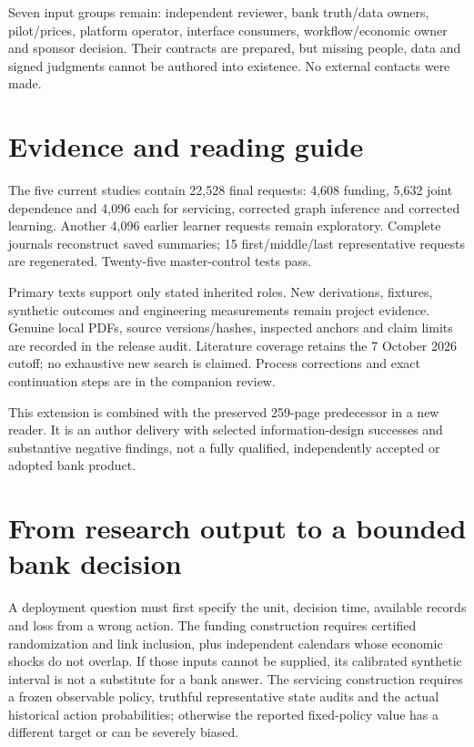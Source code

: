 Seven input groups remain: independent reviewer, bank truth/data owners, pilot/prices, platform operator, interface consumers, workflow/economic owner and sponsor decision. Their contracts are prepared, but missing people, data and signed judgments cannot be authored into existence. No external contacts were made.

\section*{Evidence and reading guide}
The five current studies contain 22,528 final requests: 4,608 funding, 5,632 joint dependence and 4,096 each for servicing, corrected graph inference and corrected learning. Another 4,096 earlier learner requests remain exploratory. Complete journals reconstruct saved summaries; 15 first/middle/last representative requests are regenerated. Twenty-five master-control tests pass.

Primary texts support only stated inherited roles. New derivations, fixtures, synthetic outcomes and engineering measurements remain project evidence. Genuine local PDFs, source versions/hashes, inspected anchors and claim limits are recorded in the release audit. Literature coverage retains the 7 October 2026 cutoff; no exhaustive new search is claimed. Process corrections and exact continuation steps are in the companion review.

This extension is combined with the preserved 259-page predecessor in a new reader. It is an author delivery with selected information-design successes and substantive negative findings, not a fully qualified, independently accepted or adopted bank product.

\section*{From research output to a bounded bank decision}
A deployment question must first specify the unit, decision time, available records and loss from a wrong action. The funding construction requires certified randomization and link inclusion, plus independent calendars whose economic shocks do not overlap. If those inputs cannot be supplied, its calibrated synthetic interval is not a substitute for a bank answer. The servicing construction requires a frozen observable policy, truthful representative state audits and the actual historical action probabilities; otherwise the reported fixed-policy value has a different target or can be severely biased.

